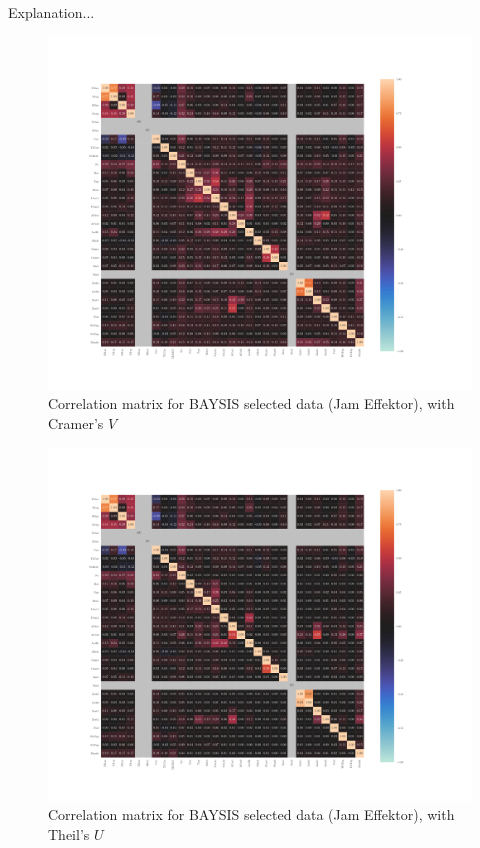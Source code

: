 \documentclass[a4paper,headsepline,footsepline,fontsize=11pt,BCOR=12mm,DIV=12]{report}
\begin{document}
\begin{appendices}
Explanation...

\begin{figure}[h]
	\centering
	\includegraphics[scale=0.52, trim=2cm 2cm 0cm 0cm]{../CorrAnalysis/data/BAYSIS/03_selected_02_duringJam/plots/baysis_selected_corr_cramers}
	\caption{Correlation matrix for BAYSIS selected data (Jam Effektor), with Cramer's $V$}
	\label{img:appendix_correlation_matrix_selected_startJam_cramers}
\end{figure}
\restoregeometry

\label{appendix_baysis_dataset_corr_theils}
\begin{figure}[h]
	\centering
	\includegraphics[scale=0.52, trim=2cm 2cm 0cm 0cm]{../CorrAnalysis/data/BAYSIS/03_selected_02_duringJam/plots/baysis_selected_corr_theils}
	\caption{Correlation matrix for BAYSIS selected data (Jam Effektor), with Theil's $U$}
	\label{img:appendix_correlation_matrix_selected_startJam_theils}
\end{figure}
\restoregeometry


\end{appendices}
\end{document}
